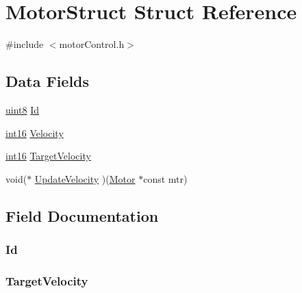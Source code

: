 \hypertarget{struct_motor_struct}{}\section{Motor\+Struct Struct Reference}
\label{struct_motor_struct}


{\ttfamily \#include $<$motor\+Control.\+h$>$}

\subsection*{Data Fields}
\begin{DoxyCompactItemize}
\item 
\hyperlink{_h_y_d_r_a_s_8_x_2types_8h_a33a5e996e7a90acefb8b1c0bea47e365}{uint8} \hyperlink{struct_motor_struct_a732a47f39ada1194ceeb8b2dc83c6d8c}{Id}
\item 
\hyperlink{_h_y_d_r_a_s_8_x_2types_8h_aa0d0fdc87fd135ef2bedb030901cdb9c}{int16} \hyperlink{struct_motor_struct_adc16841deb19f1da341eec0e8f1d0cce}{Velocity}
\item 
\hyperlink{_h_y_d_r_a_s_8_x_2types_8h_aa0d0fdc87fd135ef2bedb030901cdb9c}{int16} \hyperlink{struct_motor_struct_a2e52997470a19b186991ac0a39302983}{Target\+Velocity}
\item 
void($\ast$ \hyperlink{struct_motor_struct_ac44bd3fd97a074a0f7494c1b4d41f48b}{Update\+Velocity} )(\hyperlink{_p_m_u_d_8_x_2debug_2_p_i_c24_f_j32_g_b004_2_t_c_b_2src_2motor_control_8h_a769469315e63d8c0ea1e9c7a42f4b80d}{Motor} $\ast$const mtr)
\end{DoxyCompactItemize}


\subsection{Field Documentation}
\hypertarget{struct_motor_struct_a732a47f39ada1194ceeb8b2dc83c6d8c}{}
\subsubsection[{Id}]{ Id}\label{struct_motor_struct_a732a47f39ada1194ceeb8b2dc83c6d8c}
\hypertarget{struct_motor_struct_a2e52997470a19b186991ac0a39302983}{}
\subsubsection[{Target\+Velocity}]{ Target\+Velocity}\label{struct_motor_struct_a2e52997470a19b186991ac0a39302983}
\hypertarget{struct_motor_struct_ac44bd3fd97a074a0f7494c1b4d41f48b}{}
